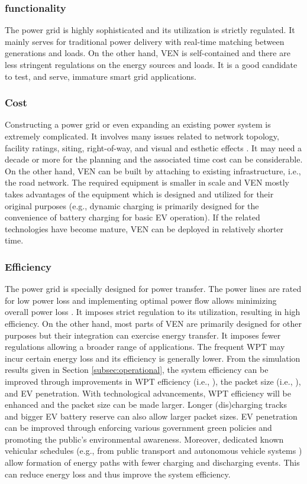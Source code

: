 \documentclass[journal]{IEEEtran}
\begin{document}
\subsubsection{functionality}
The power grid is highly sophisticated and its utilization is strictly regulated. It mainly serves for traditional power delivery with real-time matching between generations and loads. On the other hand, VEN is self-contained and there are less stringent regulations on the energy sources and loads. It is a good candidate to test, and serve, immature smart grid applications.
\subsubsection{Cost}
Constructing a power grid or even expanding an existing power system is extremely complicated. It involves many issues related to network topology, facility ratings, siting, right-of-way, and visual and esthetic effects \cite{windcost,SEP1,SEP2}. It may need a decade or more for the planning and the associated time cost can be considerable. On the other hand, VEN can be built by attaching to existing infrastructure, i.e., the road network. The required equipment is smaller in scale and VEN mostly takes advantages of the equipment which is designed and utilized for their original purposes (e.g., dynamic charging is primarily designed for the convenience of battery charging for basic EV operation). If the related technologies have become mature, VEN can be deployed in relatively shorter time.
\subsubsection{Efficiency}
The power grid is specially designed for power transfer. The power lines are rated for low power loss and implementing optimal power flow allows minimizing overall power loss \cite{OPF}. It imposes strict regulation to its utilization, resulting in high efficiency. On the other hand, most parts of VEN are primarily designed for other purposes but their integration can exercise energy transfer. It imposes fewer regulations allowing a broader range of applications. The frequent WPT may incur certain energy loss and its efficiency is generally lower. 
From the simulation results given in Section \ref{subsec:operational}, the system efficiency can be improved through improvements in WPT efficiency (i.e., ), the packet size (i.e., ), and EV penetration. With technological advancements, WPT efficiency will be enhanced and the packet size can be made larger. Longer (dis)charging tracks and bigger EV battery reserve can also allow larger packet sizes. EV penetration can be improved through enforcing various government green policies and promoting the public's environmental awareness. Moreover, dedicated known vehicular schedules (e.g., from public transport and autonomous vehicle systems \cite{AVPTS}) allow formation of energy paths with fewer charging and discharging events. This can reduce energy loss and thus improve the system efficiency.
\end{document}
